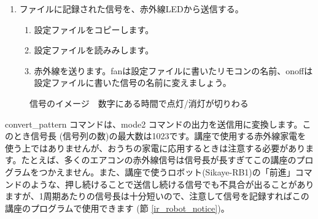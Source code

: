 \begin{enumerate}
\begin{enumerate}[1]
\begin{enumerate}[(1)]
\\onoff.patternに書かれた信号は、たとえば「1207 588 447 838 447 823 475 812 1218」のような文字列です。\\書き換えたら、しましょう (名前が05.lircd.confになっていることをしましょう)。
  \end{enumerate}
 \end{enumerate}
\item ファイルに記録された信号を、赤外線LEDから送信する。
 \begin{enumerate}[1]
  \item 設定ファイルをコピーします。 \\ 
  \item 設定ファイルを読みみします。\\ 
  \item 赤外線を送ります。fanは設定ファイルに書いたリモコンの名前、onoffは設定ファイルに書いた信号の名前に変えましょう。\\  
 \end{enumerate}
\end{enumerate}

\begin{figure}[H]
    \centering
 
    \caption{信号のイメージ　数字にある時間で点灯/消灯が切りわる}
\end{figure}

convert\_pattern コマンドは、mode2 コマンドの出力を送信用に変換します。このとき信号長 (信号列の数)の最大数は1023です。講座で使用する赤外線家電を使う上ではありませんが、おうちの家電に応用するときは注意する必要があります。たとえば、多くのエアコンの赤外線信号は信号長が長すぎてこの講座のプログラムをつかえません。また、講座で使うロボット(Sikaye-RB1)の「前進」コマンドのような、押し続けることで送信し続ける信号でも不具合が出ることがありますが、1周期あたりの信号長は十分短いので、注意して信号を記録すればこの講座のプログラムで使用できます (節 \ref{ir_robot_notice})。\\

\begin{tcolorbox}[title=\useOmetoi]
    \begin{enumerate}
    \end{enumerate}
    \end{tcolorbox}
